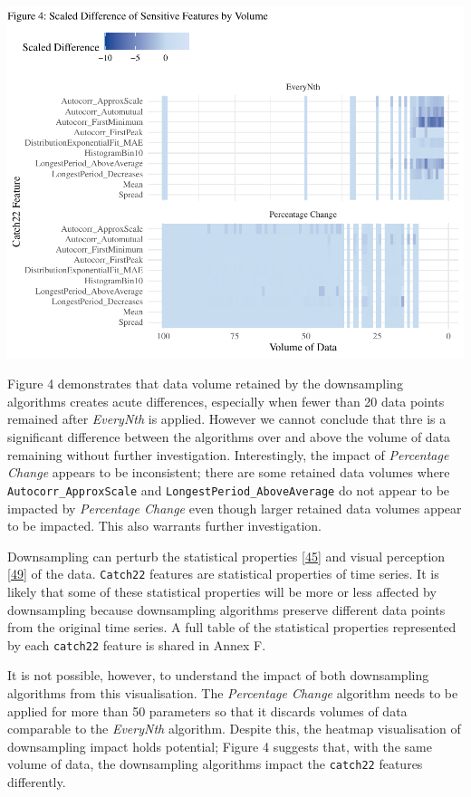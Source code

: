 \documentclass{article}
\begin{document}
\includegraphics{210431461_CSC8639_Dissertation_files/figure-latex/Heatmap_vol-1.pdf}

Figure 4 demonstrates that data volume retained by the downsampling
algorithms creates acute differences, especially when fewer than 20 data
points remained after \emph{EveryNth} is applied. However we cannot
conclude that thre is a significant difference between the algorithms
over and above the volume of data remaining without further
investigation. Interestingly, the impact of \emph{Percentage Change}
appears to be inconsistent; there are some retained data volumes where
\texttt{Autocorr\_ApproxScale} and \texttt{LongestPeriod\_AboveAverage}
do not appear to be impacted by \emph{Percentage Change} even though
larger retained data volumes appear to be impacted. This also warrants
further investigation.

Downsampling can perturb the statistical properties
\protect\hyperlink{ref-ATIChangePoint}{{[}45{]}} and visual perception
\protect\hyperlink{ref-graphsampling}{{[}49{]}} of the data.
\texttt{Catch22} features are statistical properties of time series. It
is likely that some of these statistical properties will be more or less
affected by downsampling because downsampling algorithms preserve
different data points from the original time series. A full table of the
statistical properties represented by each \texttt{catch22} feature is
shared in Annex F.

It is not possible, however, to understand the impact of both
downsampling algorithms from this visualisation. The \emph{Percentage
Change} algorithm needs to be applied for more than 50 parameters so
that it discards volumes of data comparable to the \emph{EveryNth}
algorithm. Despite this, the heatmap visualisation of downsampling
impact holds potential; Figure 4 suggests that, with the same volume of
data, the downsampling algorithms impact the \texttt{catch22} features
differently.
\end{document}
